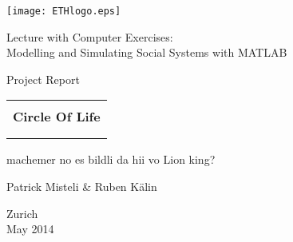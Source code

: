 
\thispagestyle{empty}

\begin{center}
\texttt{[image: ETHlogo.eps]}

\bigskip


\bigskip


\bigskip


\LARGE{ 	Lecture with Computer Exercises:\\ }
\LARGE{ Modelling and Simulating Social Systems with MATLAB\\}

\bigskip

\bigskip

\small{Project Report}\\

\bigskip

\bigskip

\bigskip

\bigskip


\begin{tabular}{|c|}
\hline
\\
\textbf{\LARGE{Circle Of Life}}\\
\textbf{\LARGE{}}\\
\\
\hline
\end{tabular}
\bigskip
machemer no es bildli da hii vo Lion king?
\bigskip

\bigskip

\LARGE{Patrick Misteli \& Ruben K{\"a}lin}



\bigskip

\bigskip

\bigskip

\bigskip

\bigskip

\bigskip

\bigskip

\bigskip

Zurich\\
May 2014\\

\end{center}



